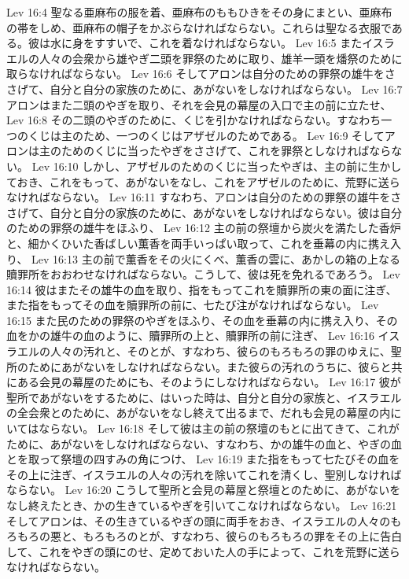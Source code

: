 Lev 16:4  聖なる亜麻布の服を着、亜麻布のももひきをその身にまとい、亜麻布の帯をしめ、亜麻布の帽子をかぶらなければならない。これらは聖なる衣服である。彼は水に身をすすいで、これを着なければならない。
Lev 16:5  またイスラエルの人々の会衆から雄やぎ二頭を罪祭のために取り、雄羊一頭を燔祭のために取らなければならない。
Lev 16:6  そしてアロンは自分のための罪祭の雄牛をささげて、自分と自分の家族のために、あがないをしなければならない。
Lev 16:7  アロンはまた二頭のやぎを取り、それを会見の幕屋の入口で主の前に立たせ、
Lev 16:8  その二頭のやぎのために、くじを引かなければならない。すなわち一つのくじは主のため、一つのくじはアザゼルのためである。
Lev 16:9  そしてアロンは主のためのくじに当ったやぎをささげて、これを罪祭としなければならない。
Lev 16:10  しかし、アザゼルのためのくじに当ったやぎは、主の前に生かしておき、これをもって、あがないをなし、これをアザゼルのために、荒野に送らなければならない。
Lev 16:11  すなわち、アロンは自分のための罪祭の雄牛をささげて、自分と自分の家族のために、あがないをしなければならない。彼は自分のための罪祭の雄牛をほふり、
Lev 16:12  主の前の祭壇から炭火を満たした香炉と、細かくひいた香ばしい薫香を両手いっぱい取って、これを垂幕の内に携え入り、
Lev 16:13  主の前で薫香をその火にくべ、薫香の雲に、あかしの箱の上なる贖罪所をおおわせなければならない。こうして、彼は死を免れるであろう。
Lev 16:14  彼はまたその雄牛の血を取り、指をもってこれを贖罪所の東の面に注ぎ、また指をもってその血を贖罪所の前に、七たび注がなければならない。
Lev 16:15  また民のための罪祭のやぎをほふり、その血を垂幕の内に携え入り、その血をかの雄牛の血のように、贖罪所の上と、贖罪所の前に注ぎ、
Lev 16:16  イスラエルの人々の汚れと、そのとが、すなわち、彼らのもろもろの罪のゆえに、聖所のためにあがないをしなければならない。また彼らの汚れのうちに、彼らと共にある会見の幕屋のためにも、そのようにしなければならない。
Lev 16:17  彼が聖所であがないをするために、はいった時は、自分と自分の家族と、イスラエルの全会衆とのために、あがないをなし終えて出るまで、だれも会見の幕屋の内にいてはならない。
Lev 16:18  そして彼は主の前の祭壇のもとに出てきて、これがために、あがないをしなければならない、すなわち、かの雄牛の血と、やぎの血とを取って祭壇の四すみの角につけ、
Lev 16:19  また指をもって七たびその血をその上に注ぎ、イスラエルの人々の汚れを除いてこれを清くし、聖別しなければならない。
Lev 16:20  こうして聖所と会見の幕屋と祭壇とのために、あがないをなし終えたとき、かの生きているやぎを引いてこなければならない。
Lev 16:21  そしてアロンは、その生きているやぎの頭に両手をおき、イスラエルの人々のもろもろの悪と、もろもろのとが、すなわち、彼らのもろもろの罪をその上に告白して、これをやぎの頭にのせ、定めておいた人の手によって、これを荒野に送らなければならない。
